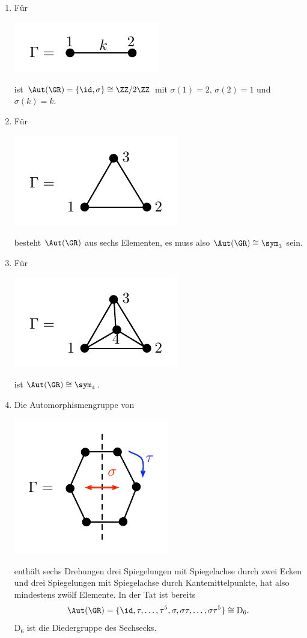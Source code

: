 \BSP\
\begin{enumerate}
\item Für
\begin{center}
	\includegraphics{grugraImages/aut1}
\end{center}
ist $\Aut(\GR)=\{\id,\sigma\}\cong \ZZ/2\ZZ$ mit
$\sigma(1)=2$, $\sigma(2)=1$ und $\sigma(k)=\bar{k}$.
\item Für
\begin{center}
	\includegraphics{grugraImages/aut2}
\end{center}
besteht $\Aut(\GR)$ aus sechs Elementen, es muss also
$\Aut(\GR)\cong \sym_3$ sein.
\item Für
\begin{center}
	\includegraphics{grugraImages/aut3}
\end{center}
ist $\Aut(\GR)\cong \sym_4$.
\item Die Automorphismengruppe von
\begin{center}
	\includegraphics{grugraImages/aut4}
\end{center}
enthält sechs Drehungen drei Spiegelungen mit Spiegelachse
durch zwei Ecken und drei Spiegelungen mit Spiegelachse durch
Kantemittelpunkte, hat also mindestens zwölf Elemente.
In der Tat ist bereits
\[
\Aut(\GR) = \{\id,\tau,\ldots,\tau^5,
	\sigma,\sigma\tau,\ldots,\sigma \tau^5 \}
\cong \mathrm{D}_6.
\]
$\mathrm{D}_6$ ist die Diedergruppe des Sechsecks.
\end{enumerate}

